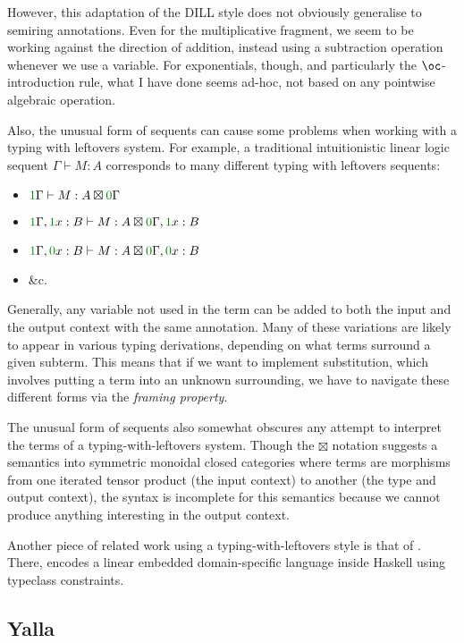 However, this adaptation of the DILL style does not obviously generalise to
semiring annotations.
Even for the multiplicative fragment, we seem to be working against the
direction of addition, instead using a subtraction operation whenever we use a
variable.
For exponentials, though, and particularly the $\oc$-introduction rule, what I
have done seems ad-hoc, not based on any pointwise algebraic operation.

Also, the unusual form of sequents can cause some problems when working with a
typing with leftovers system.
For example, a traditional intuitionistic linear logic sequent
$\Gamma \vdash M : A$ corresponds to many different typing with leftovers
sequents:
\begin{itemize}
  \item $\gr1\Gamma \vdash M : A \boxtimes \gr0\Gamma$
  \item $\gr1\Gamma, \gr1x : B \vdash M : A \boxtimes \gr0\Gamma, \gr1x : B$
  \item $\gr1\Gamma, \gr0x : B \vdash M : A \boxtimes \gr0\Gamma, \gr0x : B$
  \item \&c.
\end{itemize}

Generally, any variable not used in the term can be added to both the input and
the output context with the same annotation.
Many of these variations are likely to appear in various typing derivations,
depending on what terms surround a given subterm.
This means that if we want to implement substitution, which involves putting a
term into an unknown surrounding, we have to navigate these different forms via
the \emph{framing property}.

The unusual form of sequents also somewhat obscures any attempt to interpret the
terms of a typing-with-leftovers system.
Though the $\boxtimes$ notation suggests a semantics into symmetric monoidal
closed categories where terms are morphisms from one iterated tensor product
(the input context) to another (the type and output context), the syntax is
incomplete for this semantics because we cannot produce anything interesting in
the output context.

Another piece of related work using a typing-with-leftovers style is that of
\citet{polakow15}.
There, \citeauthor{polakow15} encodes a linear embedded domain-specific language
inside Haskell using typeclass constraints.

\subsection{Yalla}

